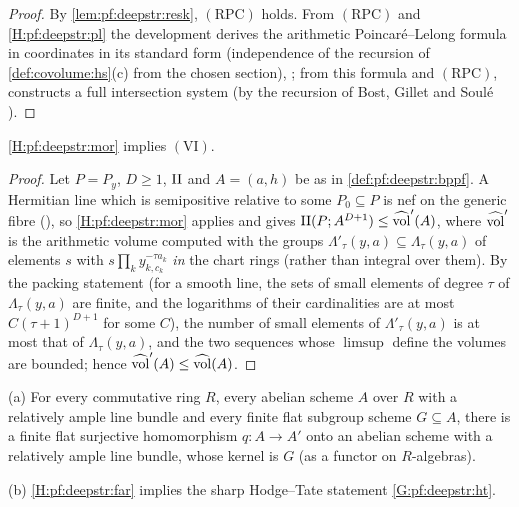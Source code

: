 \begin{proof}
By \cref{lem:pf:deepstr:resk}, $\mathrm{(RPC)}$ holds. From $\mathrm{(RPC)}$ and \ref{H:pf:deepstr:pl} the
development derives the arithmetic Poincar\'e--Lelong formula in coordinates in its standard form
(independence of the recursion of \cref{def:covolume:hs}(c) from the chosen section),
; from this formula and
$\mathrm{(RPC)}$, 
constructs a full intersection system (by the recursion of Bost, Gillet and Soul\'e
\cite{BostGilletSoule1994}).
\end{proof}

\begin{lemma}\label{lem:pf:deepstr:vi}
\ref{H:pf:deepstr:mor} implies $\mathrm{(VI)}$.
\end{lemma}

\begin{proof}
Let $P=P_y$, $D\ge1$, $\mathrm{II}$ and $A=(a,h)$ be as in \cref{def:pf:deepstr:bppf}. A Hermitian line which is
semipositive relative to some $P_0\subseteq P$ is nef on the generic fibre
(), so
\ref{H:pf:deepstr:mor} applies and gives $\mathrm{II}(P;A^{D+1})\le\widehat{\operatorname{vol}}'(A)$, where $\widehat{\operatorname{vol}}'$ is the
arithmetic volume computed with the groups $\Lambda'_\tau(y,a)\subseteq\Lambda_\tau(y,a)$ of elements $s$ with
$s\prod_ky_{k,c_k}^{-\tau a_k}$ \emph{in} the chart rings (rather than integral over them). By the packing
statement  (for a smooth line, the sets of small elements of degree $\tau$ of
$\Lambda_\tau(y,a)$ are finite, and the logarithms of their cardinalities are at most $C(\tau+1)^{D+1}$ for some
$C$), the number of small elements of $\Lambda'_\tau(y,a)$ is at most that of $\Lambda_\tau(y,a)$, and the two
sequences whose $\limsup$ define the volumes are bounded; hence $\widehat{\operatorname{vol}}'(A)\le\widehat{\operatorname{vol}}(A)$.
\end{proof}

\begin{lemma}\label{lem:pf:deepstr:quot}
\textup{(a)} For every commutative ring $R$, every abelian scheme $A$ over $R$ with a relatively ample line
bundle and every finite flat subgroup scheme $G\subseteq A$, there is a finite flat surjective homomorphism
$q\colon A\to A'$ onto an abelian scheme with a relatively ample line bundle, whose kernel is $G$ (as a functor on
$R$-algebras).

\textup{(b)} \ref{H:pf:deepstr:far} implies the sharp Hodge--Tate statement \ref{G:pf:deepstr:ht}.
\end{lemma}


